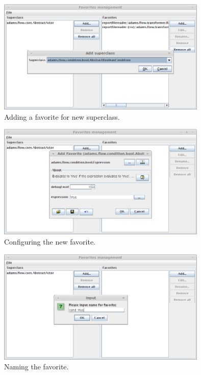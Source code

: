 \begin{figure}[htb]
  \centering
  \includegraphics[width=10.0cm]{images/favoritesmanagement-addsuper1.png}
  \caption{Adding a favorite for new superclass.}
  \label{favoritesmanagement-addsuper1}
\end{figure}

\begin{figure}[htb]
  \centering
  \includegraphics[width=10.0cm]{images/favoritesmanagement-addsuper2.png}
  \caption{Configuring the new favorite.}
  \label{favoritesmanagement-addsuper2}
\end{figure}

\begin{figure}[htb]
  \centering
  \includegraphics[width=10.0cm]{images/favoritesmanagement-addsuper3.png}
  \caption{Naming the favorite.}
  \label{favoritesmanagement-addsuper3}
\end{figure}

